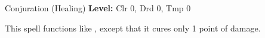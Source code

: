 {Conjuration (Healing)}
{
	\textbf{Level:}
	Clr 0, Drd 0, Tmp 0\\
}
{
	This spell functions like , except that it cures only 1 point of damage.

}
